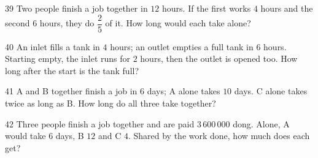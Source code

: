 \gap
\begin{probbox}{39}{}
Two people finish a job together in $12$ hours. If the first works $4$ hours and the second $6$ hours, they do $\dfrac25$ of it. How long would each take alone?
\end{probbox}
\gap
\begin{probbox}{40}{}
An inlet fills a tank in $4$ hours; an outlet empties a full tank in $6$ hours. Starting empty, the inlet runs for $2$ hours, then the outlet is opened too. How long after the start is the tank full?
\end{probbox}
\gap
\begin{probbox}{41}{}
A and B together finish a job in $6$ days; A alone takes $10$ days. C alone takes twice as long as B. How long do all three take together?
\end{probbox}
\gap
\begin{probbox}{42}{}
Three people finish a job together and are paid $3\,600\,000$ dong. Alone, A would take $6$ days, B $12$ and C $4$. Shared by the work done, how much does each get?
\end{probbox}
